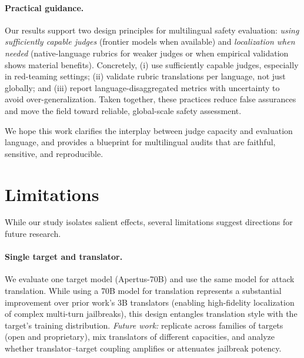 \paragraph{Practical guidance.} Our results support two design principles for multilingual safety evaluation: \emph{using sufficiently capable judges} (frontier models when available) and \emph{localization when needed} (native-language rubrics for weaker judges or when empirical validation shows material benefits). Concretely, (i) use sufficiently capable judges, especially in red-teaming settings; (ii) validate rubric translations per language, not just globally; and (iii) report language-disaggregated metrics with uncertainty to avoid over-generalization. Taken together, these practices reduce false assurances and move the field toward reliable, global-scale safety assessment.

\vspace{4pt}
\noindent We hope this work clarifies the interplay between judge capacity and evaluation language, and provides a blueprint for multilingual audits that are faithful, sensitive, and reproducible.

\section{Limitations}
\label{sec:limitations}
While our study isolates salient effects, several limitations suggest directions for future research.

\paragraph{Single target and translator.}
We evaluate one target model (Apertus-70B) and use the same model for attack translation. While using a 70B model for translation represents a substantial improvement over prior work's 3B translators (enabling high-fidelity localization of complex multi-turn jailbreaks), this design entangles translation style with the target's training distribution. \emph{Future work:} replicate across families of targets (open and proprietary), mix translators of different capacities, and analyze whether translator--target coupling amplifies or attenuates jailbreak potency.

